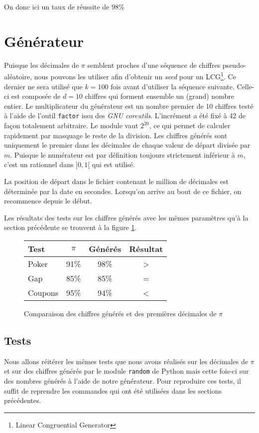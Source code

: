 \documentclass[12pt,a4paper]{article}
\begin{document}
On donc ici un taux de réussite de $98\%$
\section{Générateur}
Puisque les décimales de $\pi$ semblent proches d'une séquence de chiffres
pseudo-aléatoire, nous pouvons les utiliser afin d'obtenir un \textit{seed}
pour un LCG\footnote{Linear Congruential Generator}. Ce dernier ne sera utilisé
que $k=100$ fois avant d'utiliser la séquence suivante. Celle-ci est composée de
$d=10$ chiffres qui forment ensemble un (grand) nombre entier.
Le multiplicateur du générateur est un nombre premier de 10 chiffres testé
à l'aide de l'outil \texttt{factor} issu des \textit{GNU coreutils}.
L'incrément a été fixé à 42 de façon totalement arbitraire.
Le module vaut $2^{20}$, ce qui permet de calculer rapidement par masquage
le reste de la division.
Les chiffres générés sont uniquement le premier dans les décimales de chaque
valeur de départ divisée par $m$.
Puisque le numérateur est par définition toujours strictement inférieur à $m$,
c'est un rationnel dans $]0,1[$ qui est utilisé.

La position de départ dans le fichier contenant le million de décimales
est déterminée par la date en secondes. Lorsqu'on arrive au bout de ce fichier,
on recommence depuis le début.

Les résultats des tests sur les chiffres générés avec les mêmes paramètres
qu'à la section précédente se trouvent à la figure \ref{fig:genD}.

\begin{figure}
\center
\begin{tabular}{l|c|c|c}
Test & $\pi$ & Générés & Résultat \\ \hline \hline
Poker & 91\% & 98\% & > \\ \hline
Gap & 85\% & 85\% & = \\ \hline
Coupons & 95\% & 94\% & <
\end{tabular}
\caption{Comparaison des chiffres générés et des premières décimales de $\pi$}
\label{fig:genD}
\end{figure}

\subsection{Tests}
Nous allons réitérer les mêmes tests que nous avons réalisés sur les décimales
de $\pi$ et sur des chiffres générés par le module \texttt{random} de Python
mais cette fois-ci sur des nombres générés à l'aide de notre générateur.
Pour reproduire ces tests, il suffit de reprendre les commandes qui ont été utilisées dans les sections précédentes.
\end{document}
